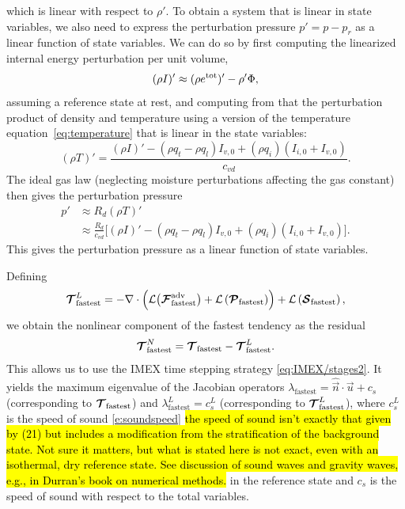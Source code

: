 \documentclass{article}
\begin{document}
which is linear with respect to $\rho'$. To obtain a system that is linear in state variables, we also need to express the perturbation  pressure $p'= p - p_r$ as a linear function of state variables. We can do so by first computing the linearized internal energy perturbation per unit volume,
\begin{equation}
(\rho I)' \approx (\rho e^{\mathrm{tot}})'  -  \rho' \Phi,
\end{equation}
assuming a reference state at rest, and computing from that the perturbation product of density and temperature
using a version of the temperature equation~\eqref{eq:temperature} that is linear in the state variables:
\begin{equation}\label{eq:temperature_perturb}
(\rho T)' =  \frac{(\rho I)'  - (\rho q_t - \rho q_l)I_{v,0} + (\rho q_i) (I_{i,0} + I_{v,0})}{c_{vd}}.
\end{equation}
The ideal gas law (neglecting moisture perturbations affecting the gas constant) then gives the perturbation pressure
\begin{equation}\label{eq:pressure_perturb}
\begin{split}
p' & \approx R_d (\rho T)' \\
   & \approx \frac{R_d}{c_{vd}} \bigl[ (\rho I)'  - (\rho q_t - \rho q_l)I_{v,0} + (\rho q_i) (I_{i,0} + I_{v,0}) \bigr].
\end{split}
\end{equation}
This gives the perturbation pressure as a linear function of state variables. 

Defining 
\[
\boldsymbol{{\mathcal{T}}}^L_{\mathrm{fastest}}  = - \nabla \cdot \left( \mathcal{L} \bigl(\boldsymbol{{\mathcal{F}}}^{\mathrm{adv}}_{\mathrm{fastest}}\bigr) + \mathcal{L}\left(\boldsymbol{{\mathcal{P}}}_{\mathrm{fastest}}\right) \right) + \mathcal{L}\left( \boldsymbol{{\mathcal{S}}}_{\mathrm{fastest}}\right),
\]
we obtain the nonlinear component of the fastest tendency as the residual 
\[
\boldsymbol{{\mathcal{T}}}^N_{\mathrm{fastest}} = \boldsymbol{{\mathcal{T}}}_{\mathrm{fastest}} - \boldsymbol{{\mathcal{T}}}^L_{\mathrm{fastest}}.
\] 
This allows us to use the IMEX time stepping strategy \eqref{eq:IMEX/stages2}. It yields the maximum eigenvalue of the Jacobian operators  $\lambda_{\mathrm{fastest}}=\widehat{\vec{n}} \cdot \vec{u} + c_{s}$ (corresponding to $\boldsymbol{{\mathcal{T}}}_{\mathrm{fastest}}$) and  $\lambda^L_{\mathrm{fastest}} = c^L_s$ (corresponding to $\boldsymbol{{\mathcal{T}}}^L_{\mathrm{fastest}}$), where $c^L_s$ is the speed of sound \eqref{e:soundspeed} \hl{the speed of sound isn't exactly that given by (21) but includes a modification from the stratification of the background state. Not sure it matters, but what is stated here is not exact, even with an isothermal, dry reference state. See discussion of sound waves and gravity waves, e.g., in Durran's book on numerical methods.} in the reference state and $c_s$ is the speed of sound with respect to the total variables. 
 
\end{document}
